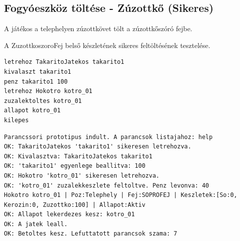 \subsection{Fogyóeszköz töltése - Zúzottkő (Sikeres)}
\begin{test-case-description}
    A játékos a telephelyen zúzottkövet tölt a zúzottkőszóró fejbe.
\end{test-case-description}
\begin{test-case-function}
    A ZuzottkoszoroFej belső készletének sikeres feltöltésének tesztelése.
\end{test-case-function}
\begin{test-case-input}
\begin{verbatim}
letrehoz TakaritoJatekos takarito1
kivalaszt takarito1
penz takarito1 100
letrehoz Hokotro kotro_01
zuzalektoltes kotro_01
allapot kotro_01
kilepes
\end{verbatim}
\end{test-case-input}
\begin{test-case-output}
\begin{verbatim}
Parancssori prototipus indult. A parancsok listajahoz: help
OK: TakaritoJatekos 'takarito1' sikeresen letrehozva.
OK: Kivalasztva: TakaritoJatekos takarito1
OK: 'takarito1' egyenlege beallitva: 100
OK: Hokotro 'kotro_01' sikeresen letrehozva.
OK: 'kotro_01' zuzalekkeszlete feltoltve. Penz levonva: 40
Hokotro kotro_01 | Poz:Telephely | Fej:SOPROFEJ | Keszletek:[So:0, Kerozin:0, Zuzottko:100] | Allapot:Aktiv
OK: Allapot lekerdezes kesz: kotro_01
OK: A jatek leall.
OK: Betoltes kesz. Lefuttatott parancsok szama: 7
\end{verbatim}
\end{test-case-output}

